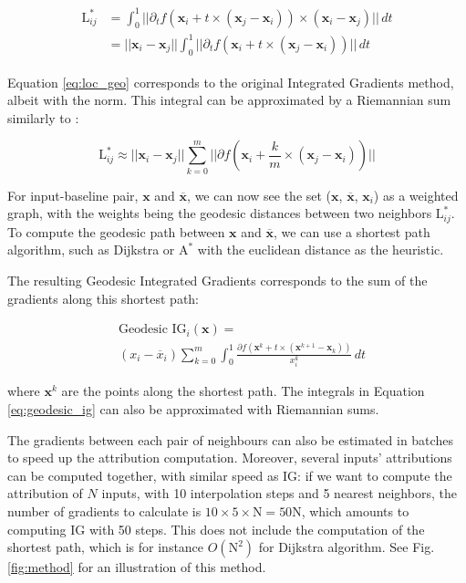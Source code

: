 \begin{align}
\begin{split}
    \textrm{L}^*_{ij} &= \int_0^1 ||\partial_t f(\textbf{x}_i + t \times (\textbf{x}_j - \textbf{x}_i)) \times (\textbf{x}_i - \textbf{x}_j) || \, dt \\
    &= ||\textbf{x}_i - \textbf{x}_j|| \int_0^1 ||\partial_t f(\textbf{x}_i + t \times (\textbf{x}_j - \textbf{x}_i))|| \, dt
\end{split}
\label{eq:loc_geo}
\end{align}

Equation \ref{eq:loc_geo} corresponds to the original Integrated Gradients method, albeit with the norm. This integral can be approximated by a Riemannian sum similarly to \cite{sundararajan2017axiomatic}: 

\begin{equation}
    \textrm{L}^*_{ij} \approx ||\textbf{x}_i - \textbf{x}_j|| \sum_{k=0}^m || \partial f(\textbf{x}_i + \frac{k}{m} \times (\textbf{x}_j - \textbf{x}_i))||
\label{eq:log_geo_approx}
\end{equation}

For input-baseline pair, $\textbf{x}$ and $\overline{\textbf{x}}$, we can now see the set ($\textbf{x}$, $\overline{\textbf{x}}$, $\textbf{x}_i$) as a weighted graph, with the weights being the geodesic distances between two neighbors $\textrm{L}^*_{ij}$. To compute the geodesic path between $\textbf{x}$ and $\overline{\textbf{x}}$, we can use a shortest path algorithm, such as Dijkstra or $\textrm{A}^*$ with the euclidean distance as the heuristic.

The resulting Geodesic Integrated Gradients corresponds to the sum of the gradients along this shortest path:

\begin{equation}
\begin{split}
    & \textrm{Geodesic IG}_i(\textbf{x}) = \\ & (x_i - \overline{x}_i) \sum_{k=0}^m \int_0^1 \frac{\partial f(\textbf{x}^k + t \times (\textbf{x}^{k+1} - \textbf{x}_k))}{x^k_i} \, dt
\end{split}
\label{eq:geodesic_ig}
\end{equation}

where $\textbf{x}^k$ are the points along the shortest path. The integrals in Equation \ref{eq:geodesic_ig} can also be approximated with Riemannian sums.

The gradients between each pair of neighbours can also be estimated in batches to speed up the attribution computation. Moreover, several inputs' attributions can be computed together, with similar speed as IG: if we want to compute the attribution of $N$ inputs, with 10 interpolation steps and 5 nearest neighbors, the number of gradients to calculate is $10 \times 5 \times \textrm{N} = 50 \textrm{N}$, which amounts to computing IG with 50 steps. This does not include the computation of the shortest path, which is for instance $O(\textrm{N}^2)$ for Dijkstra algorithm. See Fig. \ref{fig:method} for an illustration of this method.

